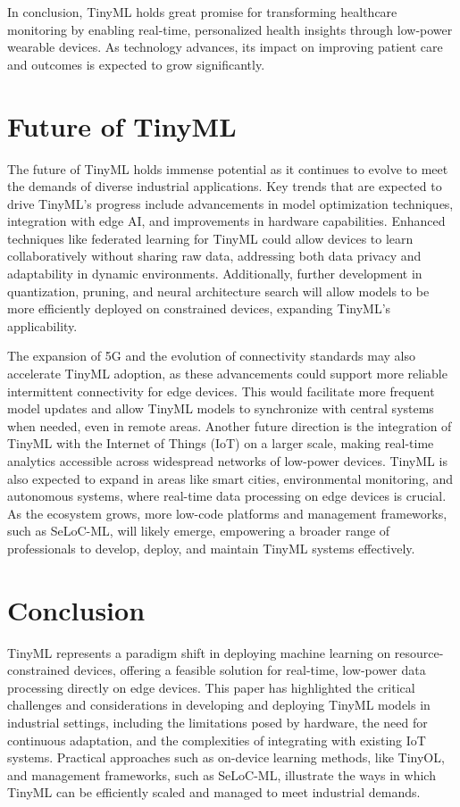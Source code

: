 \documentclass[twocolumn]{article}
\begin{document}
In conclusion, TinyML holds great promise for transforming healthcare monitoring by enabling real-time, personalized health insights through low-power wearable devices. As technology advances, its impact on improving patient care and outcomes is expected to grow significantly.


\section{Future of TinyML }
\label{future_of_tinyml}

The future of TinyML holds immense potential as it continues to evolve to meet the demands of diverse industrial applications. Key trends that are expected to drive TinyML's progress include advancements in model optimization techniques, integration with edge AI, and improvements in hardware capabilities. Enhanced techniques like federated learning for TinyML could allow devices to learn collaboratively without sharing raw data, addressing both data privacy and adaptability in dynamic environments. Additionally, further development in quantization, pruning, and neural architecture search will allow models to be more efficiently deployed on constrained devices, expanding TinyML’s applicability.

The expansion of 5G and the evolution of connectivity standards may also accelerate TinyML adoption, as these advancements could support more reliable intermittent connectivity for edge devices. This would facilitate more frequent model updates and allow TinyML models to synchronize with central systems when needed, even in remote areas. Another future direction is the integration of TinyML with the Internet of Things (IoT) on a larger scale, making real-time analytics accessible across widespread networks of low-power devices. TinyML is also expected to expand in areas like smart cities, environmental monitoring, and autonomous systems, where real-time data processing on edge devices is crucial. As the ecosystem grows, more low-code platforms and management frameworks, such as SeLoC-ML, will likely emerge, empowering a broader range of professionals to develop, deploy, and maintain TinyML systems effectively.

\section{Conclusion}
\label{conclusion}

TinyML represents a paradigm shift in deploying machine learning on resource-constrained devices, offering a feasible solution for real-time, low-power data processing directly on edge devices. This paper has highlighted the critical challenges and considerations in developing and deploying TinyML models in industrial settings, including the limitations posed by hardware, the need for continuous adaptation, and the complexities of integrating with existing IoT systems. Practical approaches such as on-device learning methods, like TinyOL, and management frameworks, such as SeLoC-ML, illustrate the ways in which TinyML can be efficiently scaled and managed to meet industrial demands.
\end{document}
